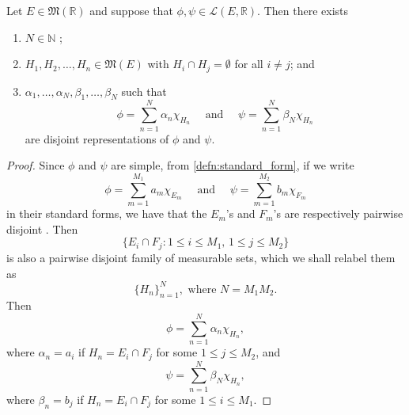\documentclass[notoc,notitlepage]{tufte-book}
\begin{document}
\begin{lemma}\label{lemma:common_disjoint_representation_of_simple_functions_over_a_common_domain}
  Let $E \in \mathfrak{M}(\mathbb{R})$ and suppose that $\phi, \psi \in
  \mathcal{L}(E, \mathbb{R})$. Then there exists
  \begin{enumerate}
    \item $N \in \mathbb{N}$ ;
    \item $H_1, H_2, \ldots, H_n \in \mathfrak{M}(E)$ with $H_i \cap H_j =
      \emptyset$ for all $i \neq j$; and
    \item $\alpha_1, \ldots, \alpha_N, \beta_1, \ldots, \beta_N$ such that
      \begin{equation*}
        \phi = \sum_{n=1}^{N} \alpha_n \chi_{H_n} \quad \text{ and } \quad
        \psi = \sum_{n=1}^{N} \beta_N \chi_{H_n}
      \end{equation*}
      are disjoint representations of $\phi$ and $\psi$.
  \end{enumerate}
\end{lemma}

\begin{proof}
  Since $\phi$ and $\psi$ are simple, from \cref{defn:standard_form}, if we
  write
  \begin{equation*}
    \phi = \sum_{m=1}^{M_1} a_m \chi_{E_m} \quad \text{ and } \quad
    \psi = \sum_{m=1}^{M_2} b_m \chi_{F_m}
  \end{equation*}
  in their standard forms, we have that the $E_m$'s and $F_m$'s are respectively
  pairwise disjoint . Then
  \begin{equation*}
    \{ E_i \cap F_j : 1 \leq i \leq M_1,\, 1 \leq j \leq M_2 \}
  \end{equation*}
  is also a pairwise disjoint family of measurable sets, which we shall relabel
  them as
  \begin{equation*}
    \{ H_n \}_{n=1}^{N}, \text{ where } N = M_1 M_2.
  \end{equation*}
  Then
  \begin{equation*}
    \phi = \sum_{n=1}^{N} \alpha_n \chi_{H_n},
  \end{equation*}
  where $\alpha_n = a_i$ if $H_n = E_i \cap F_j$ for some $1 \leq j \leq M_2$,
  and
  \begin{equation*}
    \psi = \sum_{n=1}^{N} \beta_N \chi_{H_n},
  \end{equation*}
  where $\beta_n = b_j$ if $H_n = E_i \cap F_j$ for some $1 \leq i \leq M_1$.
\end{proof}
\end{document}
